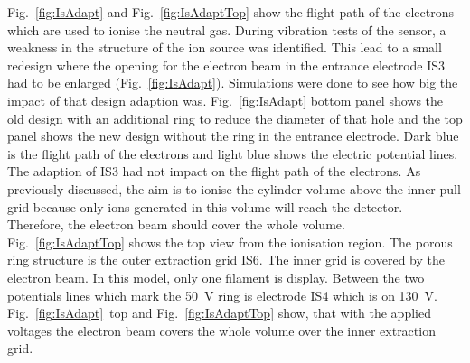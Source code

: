 	Fig.~\ref{fig:IsAdapt} and Fig.~\ref{fig:IsAdaptTop} show the flight path of the electrons which are used to ionise the neutral gas. During vibration tests of the sensor, a weakness in the structure of the ion source was identified. This lead to a small redesign where the opening for the electron beam in the entrance electrode IS3 had to be enlarged (Fig.~\ref{fig:IsAdapt}). Simulations were done to see how big the impact of that design adaption was. Fig.~\ref{fig:IsAdapt} bottom panel shows the old design with an additional ring to reduce the diameter of that hole and the top panel shows the new design without the ring in the entrance electrode. Dark blue is the flight path of the electrons and light blue shows the electric potential lines. The adaption of IS3 had not impact on the flight path of the electrons. As previously discussed, the aim is to ionise the cylinder volume above the inner pull grid because only ions generated in this volume will reach the detector. Therefore, the electron beam should cover the whole volume.	Fig.~\ref{fig:IsAdaptTop} shows the top view from the ionisation region. The porous ring structure is the outer extraction grid IS6. The inner grid is covered by the electron beam. In this model, only one filament is display. Between the two potentials lines which mark the 50~V ring is electrode IS4 which is on 130~V. Fig.~\ref{fig:IsAdapt}~top and Fig.~\ref{fig:IsAdaptTop} show, that with the applied voltages the electron beam covers the whole volume over the inner extraction grid.
	\newpage
	
	
	
	

